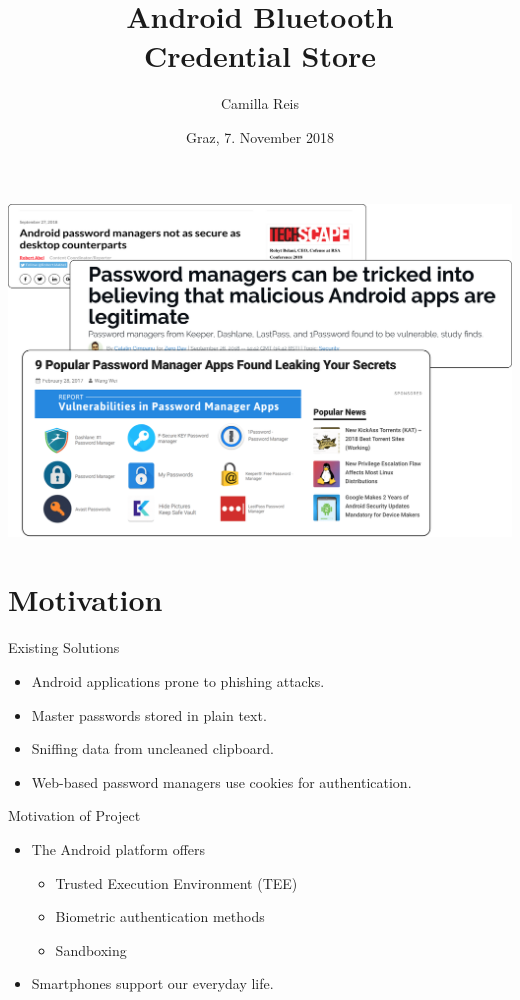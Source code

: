 \documentclass{beamer}
\title[Android Bluetooth Credential Store]{Android Bluetooth \\ Credential Store}
\author{Camilla Reis}
\date{Graz, 7. November 2018}
\institute[IAIK]{\\ Institute of Applied Information Processing and Communications}
\begin{document}
\titleframe

\begin{frame}
	\centering
	\vfill
	\includegraphics[width=1\textwidth]{images/papers.png}
	\vfill
\end{frame}


\section{Motivation}
\begin{frame}{Existing Solutions}
	\begin{itemize}
		\item Android applications prone to phishing attacks.
		\item Master passwords stored in plain text.
		\item Sniffing data from uncleaned clipboard.
		\item Web-based password managers use cookies for authentication.
	\end{itemize}
\end{frame}


\begin{frame}{Motivation of Project}
\vspace{-5mm}
\begin{itemize}
	\item The Android platform offers
	\begin{itemize}
		\item Trusted Execution Environment (TEE)
		\item Biometric authentication methods
		\item Sandboxing
	\end{itemize}
	\item Smartphones support our everyday life.
\end{itemize}
\end{frame}
\end{document}
